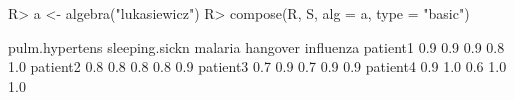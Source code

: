 \begin{Schunk}
% --begin: "comp.basic"
\begin{Sinput}
R> a <- algebra("lukasiewicz")
R> compose(R, S, alg = a, type = "basic")
\end{Sinput}
\begin{Soutput}
         pulm.hypertens sleeping.sickn malaria hangover influenza
patient1            0.9            0.9     0.9      0.8       1.0
patient2            0.8            0.8     0.8      0.8       0.9
patient3            0.7            0.9     0.7      0.9       0.9
patient4            0.9            1.0     0.6      1.0       1.0
\end{Soutput}
%
% --end: "comp.basic"
\end{Schunk}
